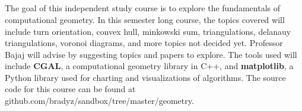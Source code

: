 \documentclass[12pt]{article}
\title{\textmd{\bf \Class\\}}
\author{\small \normalfont{Advisor: Chandrajit Bajaj} \\
\small \normalfont{\StudentName}}
\date{}
\begin{document}
\maketitle \thispagestyle{empty}

 \newline \\
\indent The goal of this independent study course is to explore the fundamentals of computational geometry. In this semester long course, the topics covered will include turn orientation, convex hull, minkowski sum, triangulations, delanauy triangulations, voronoi diagrams, and more topics not decided yet. Professor Bajaj will advise by suggesting topics and papers to explore. The tools used will include \textbf{CGAL}, a computational geometry library in C++, and \textbf{matplotlib}, a Python library used for charting and visualizations of algorithms. The source code for this course can be found at github.com/bradyz/sandbox/tree/master/geometry. \newline

\newpage
\end{document}
